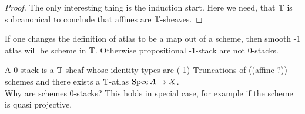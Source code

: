 \documentclass{article}
\newcommand{\affineA}{(affine ?)}
\newcommand{\truncation}{$\bT$runcation}
\newcommand{\red}[1]{{\color{red} #1}}
\begin{document}
\begin{proof}
    The only interesting thing is the induction start. Here we need, that $\mathbb{T}$ is subcanonical to conclude that affines are $\mathbb{T}$-sheaves.
\end{proof}
\begin{rmk}
    If one changes the definition of atlas to be a map out of a scheme, then smooth -1 atlas will be scheme in $\mathbb{T}$. Otherwise propositional -1-stack are not 0-stacks.
\end{rmk}
\begin{example}
    A  0-stack is a $\mathbb{T}$-sheaf whose identity types are \red{(-1)-\truncation s of} (\affineA) schemes and there exists a $\mathbb{T}$-atlas $\operatorname{Spec} A \to X$. \\
    Why are schemes  0-stacks? This holds in special case, for example if the scheme is quasi projective. 
\end{example}
\end{document}
